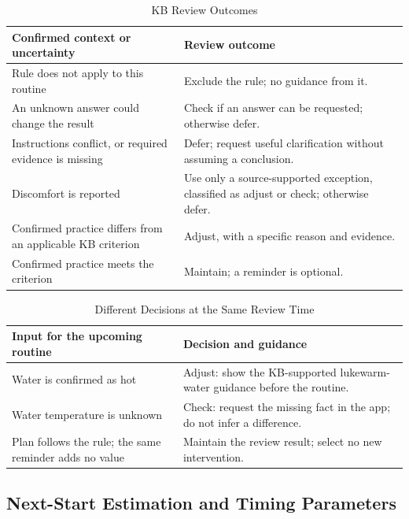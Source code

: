 \documentclass[conference,letterpaper]{IEEEtran}
\begin{document}
\begin{table}[!t]
\caption{KB Review Outcomes}\label{tab:outcomes}
\centering\footnotesize
\renewcommand{\arraystretch}{1.12}\setlength{\tabcolsep}{3pt}
\begin{tabularx}{\columnwidth}{@{}>{\raggedright\arraybackslash}X>{\raggedright\arraybackslash}X@{}}\toprule
\textbf{Confirmed context or uncertainty} & \textbf{Review outcome}\\\midrule
Rule does not apply to this routine & Exclude the rule; no guidance from it.\\
An unknown answer could change the result & Check if an answer can be requested; otherwise defer.\\
Instructions conflict, or required evidence is missing & Defer; request useful clarification without assuming a conclusion.\\
Discomfort is reported & Use only a source-supported exception, classified as adjust or check; otherwise defer.\\
Confirmed practice differs from an applicable KB criterion & Adjust, with a specific reason and evidence.\\
Confirmed practice meets the criterion & Maintain; a reminder is optional.\\
\bottomrule
\end{tabularx}
\end{table}

\begin{table}[!t]
\caption{Different Decisions at the Same Review Time}\label{tab:example}
\centering\footnotesize
\renewcommand{\arraystretch}{1.12}\setlength{\tabcolsep}{3pt}
\begin{tabularx}{\columnwidth}{@{}>{\raggedright\arraybackslash}X>{\raggedright\arraybackslash}X@{}}\toprule
\textbf{Input for the upcoming routine} & \textbf{Decision and guidance}\\\midrule
Water is confirmed as hot & Adjust: show the KB-supported lukewarm-water guidance before the routine.\\
Water temperature is unknown & Check: request the missing fact in the app; do not infer a difference.\\
Plan follows the rule; the same reminder adds no value & Maintain the review result; select no new intervention.\\
\bottomrule
\end{tabularx}
\end{table}

\subsection{Next-Start Estimation and Timing Parameters}
\end{document}

